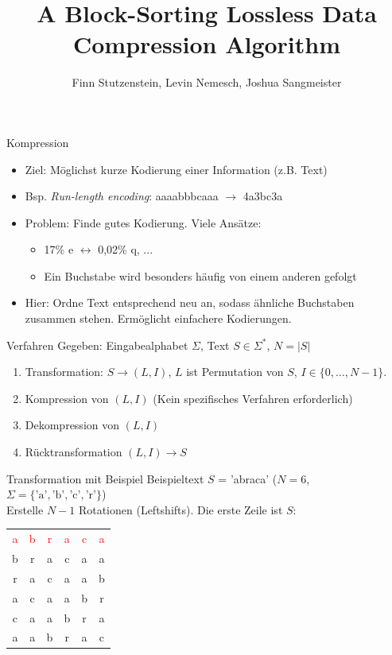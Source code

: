 \documentclass[ngerman,aspectratio=169,10pt]{beamer}
\title{\vspace*{1.5em}A Block-Sorting Lossless Data Compression Algorithm}
\subtitle{\vspace*{-1.5em}}
\author{Finn Stutzenstein, Levin Nemesch, Joshua Sangmeister}
\institute{Algorithm Engineering - Übung 5}
\newcommand{\red}[1]{\textcolor{red}{#1}}
\begin{document}
\maketitle

\begin{frame}{Kompression}
\begin{itemize}
    \item Ziel: Möglichst kurze Kodierung einer Information (z.B. Text)
    \item Bsp. \emph{Run-length encoding}: aaaabbbcaaa $\longrightarrow$ 4a3bc3a
    \item Problem: Finde gutes Kodierung. Viele Ansätze:
    \begin{itemize}
        \item 17\% e $\leftrightarrow$ 0,02\% q, ...
        \item Ein Buchstabe wird besonders häufig von einem anderen gefolgt
    \end{itemize}
    \item Hier: Ordne Text entsprechend neu an, sodass ähnliche Buchstaben zusammen stehen. Ermöglicht einfachere Kodierungen.
\end{itemize}
\end{frame}

\begin{frame}{Verfahren}
    Gegeben: Eingabealphabet $\Sigma$, Text $S\in \Sigma^*$, $N=|S|$
    \begin{enumerate}
        \item Transformation: $S\rightarrow(L, I)$, $L$ ist Permutation von $S$, $I\in\{0,\ldots,N-1\}$.
        \item Kompression von $(L, I)$ (Kein spezifisches Verfahren erforderlich)
        \item Dekompression von $(L, I)$
        \item Rücktransformation $(L, I)\rightarrow S$
    \end{enumerate}
\end{frame}

\begin{frame}{Transformation mit Beispiel}
    Beispieltext $S$ = 'abraca' ($N = 6$, $\Sigma=\{\text{'a'},\text{'b'},\text{'c'},\text{'r'}\}$)\\[1cm]
    
    Erstelle $N-1$ Rotationen (Leftshifts). Die erste Zeile ist $S$:\\
    \begin{tabular}{cccccc}
        \red{a}&\red{b}&\red{r}&\red{a}&\red{c}&\red{a}\vline\\
        b&r&a&c&a\vline&a\\
        r&a&c&a\vline&a&b\\
        a&c&a\vline&a&b&r\\
        c&a\vline&a&b&r&a\\
        a\vline&a&b&r&a&c\\
    \end{tabular}
\end{frame}
\end{document}
